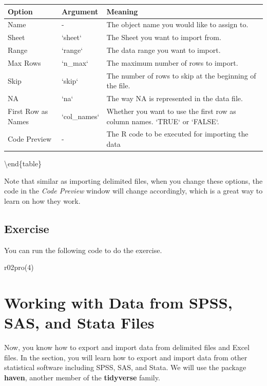 \documentclass[
]{book}
\newenvironment{Shaded}{\begin{snugshade}}{\end{snugshade}}
\newcommand{\DecValTok}[1]{\textcolor[rgb]{0.00,0.00,0.81}{#1}}
\newcommand{\FunctionTok}[1]{\textcolor[rgb]{0.00,0.00,0.00}{#1}}
\newcommand{\NormalTok}[1]{#1}
\begin{document}
\begin{tabular}[t]{l|l|l}
\hline
Option & Argument & Meaning\\
\hline
Name & - & The object name you would like to assign to.\\
\hline
Sheet & `sheet` & The Sheet you want to import from.\\
\hline
Range & `range` & The data range you want to import.\\
\hline
Max Rows & `n\_max` & The maximum number of rows to import.\\
\hline
Skip & `skip` & The number of rows to skip at the beginning of the file.\\
\hline
NA & `na` & The way NA is represented in the data file.\\
\hline
First Row as Names & `col\_names` & Whether you want to use the first row as column names. `TRUE` or `FALSE`.\\
\hline
Code Preview & - & The R code to be executed for importing the data\\
\hline
\end{tabular}

\textbackslash end\{table\}

Note that similar as importing delimited files, when you change these options, the code in the \emph{Code Preview} window will change accordingly, which is a great way to learn on how they work.

\hypertarget{exercise-8}{%
\subsection{Exercise}\label{exercise-8}}

You can run the following code to do the exercise.

\begin{Shaded}
\begin{Highlighting}[]
\FunctionTok{r02pro}\NormalTok{(}\DecValTok{4}\NormalTok{)}
\end{Highlighting}
\end{Shaded}

\hypertarget{import-other}{%
\section{Working with Data from SPSS, SAS, and Stata Files}\label{import-other}}

Now, you know how to export and import data from delimited files and Excel files. In the section, you will learn how to export and import data from other statistical software including SPSS, SAS, and Stata. We will use the package \textbf{haven}, another member of the \textbf{tidyverse} family.
\end{document}
